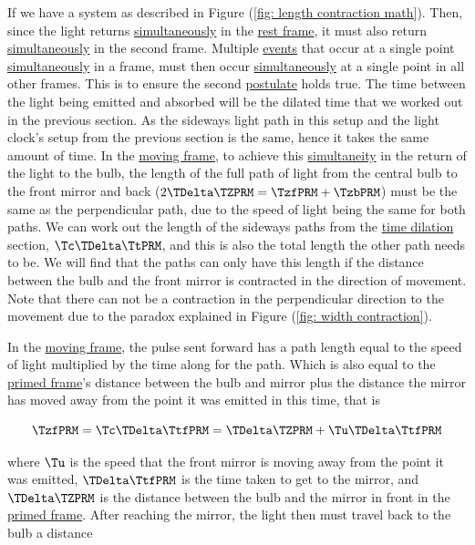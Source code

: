 If we have a system as described in Figure (\ref{fig: length contraction math}).
Then, since the light returns \hyperlink{def-simultaneity}{simultaneously} in the \hyperlink{def-proper-frame}{rest frame}, it must also return \hyperlink{def-simultaneity}{simultaneously} in the second frame.
Multiple \hyperlink{def-event}{events} that occur at a single point \hyperlink{def-simultaneity}{simultaneously} in a frame, must then occur \hyperlink{def-simultaneity}{simultaneously} at a single point in all other frames.
This is to ensure the second \hyperlink{def-postulates}{postulate} holds true.
The time between the light being emitted and absorbed will be the dilated time that we worked out in the previous section.
As the sideways light path in this setup and the light clock's setup from the previous section is the same, hence it takes the same amount of time.
In the \hyperlink{def-Moving-Frame}{moving frame}, to achieve this \hyperlink{def-simultaneity}{simultaneity} in the return of the light to the bulb, the length of the full path of light from the central bulb to the front mirror and back ($2 {\TDelta  \TZPRM } = {\TzfPRM } + {\TzbPRM }$) must be the same as the perpendicular path, due to the speed of light being the same for both paths.
We can work out the length of the sideways paths from the \hyperlink{def-time-dilation}{time dilation} section, ${\Tc }{\TDelta  \TtPRM }$, and this is also the total length the other path needs to be.
We will find that the paths can only have this length if the distance between the bulb and the front mirror is contracted in the direction of movement.
Note that there can not be a contraction in the perpendicular direction to the movement due to the paradox explained in Figure (\ref{fig: width contraction}).

In the \hyperlink{def-Moving-Frame}{moving frame}, the pulse sent forward has a path length equal to the speed of light multiplied by the time along for the path.
Which is also equal to the \hyperlink{def-Primed-Frame}{primed frame}'s distance between the bulb and mirror plus the distance the mirror has moved away from the point it was emitted in this time, that is

\begin{equation}
	{\TzfPRM } = {\Tc }{\TDelta  \TtfPRM } = {\TDelta   \TZPRM } + {\Tu } {\TDelta  \TtfPRM }
\end{equation}

where ${\Tu }$ is the speed that the front mirror is moving away from the point it was emitted, ${\TDelta  \TtfPRM }$ is the time taken to get to the mirror, and ${\TDelta   \TZPRM }$ is the distance between the bulb and the mirror in front in the \hyperlink{def-Primed-Frame}{primed frame}.
After reaching the mirror, the light then must travel back to the bulb a distance

